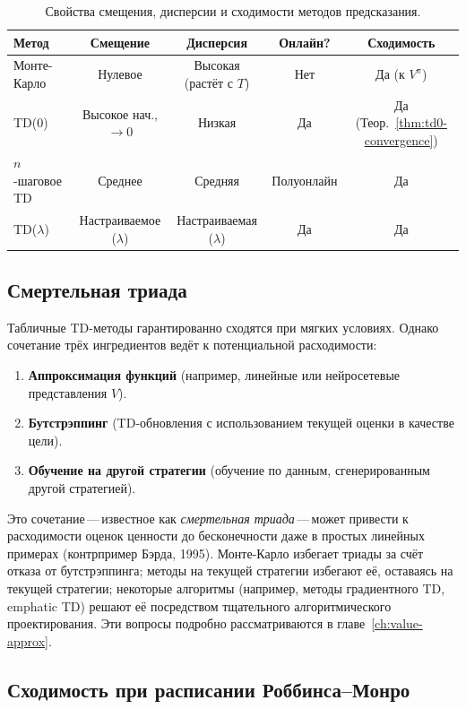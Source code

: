 \begin{table}[ht]
\centering
\caption{Свойства смещения, дисперсии и сходимости методов предсказания.}
\label{tab:bias-variance-comparison}
\begin{tabular}{lcccc}
\toprule
\textbf{Метод} & \textbf{Смещение} & \textbf{Дисперсия} & \textbf{Онлайн?} & \textbf{Сходимость}\\
\midrule
Монте-Карло & Нулевое & Высокая (растёт с $T$) & Нет & Да (к $V^\pi$)\\
TD(0) & Высокое нач., $\to 0$ & Низкая & Да & Да (Теор.~\ref{thm:td0-convergence})\\
$n$-шаговое TD & Среднее & Средняя & Полуонлайн & Да\\
TD($\lambda$) & Настраиваемое ($\lambda$) & Настраиваемая ($\lambda$) & Да & Да\\
\bottomrule
\end{tabular}
\end{table}

\subsection{Смертельная триада}

Табличные TD-методы гарантированно сходятся при мягких условиях.  Однако сочетание трёх ингредиентов ведёт к потенциальной расходимости:
\begin{enumerate}
  \item \textbf{Аппроксимация функций} (например, линейные или нейросетевые представления $V$).
  \item \textbf{Бутстрэппинг} (TD-обновления с использованием текущей оценки в качестве цели).
  \item \textbf{Обучение на другой стратегии} (обучение по данным, сгенерированным другой стратегией).
\end{enumerate}
Это сочетание\,---\,известное как \emph{смертельная триада}\,---\,может привести к расходимости оценок ценности до бесконечности даже в простых линейных примерах (контрпример Бэрда, 1995).  Монте-Карло избегает триады за счёт отказа от бутстрэппинга; методы на текущей стратегии избегают её, оставаясь на текущей стратегии; некоторые алгоритмы (например, методы градиентного TD, emphatic TD) решают её посредством тщательного алгоритмического проектирования.  Эти вопросы подробно рассматриваются в главе~\ref{ch:value-approx}.

\subsection{Сходимость при расписании Роббинса--Монро}

